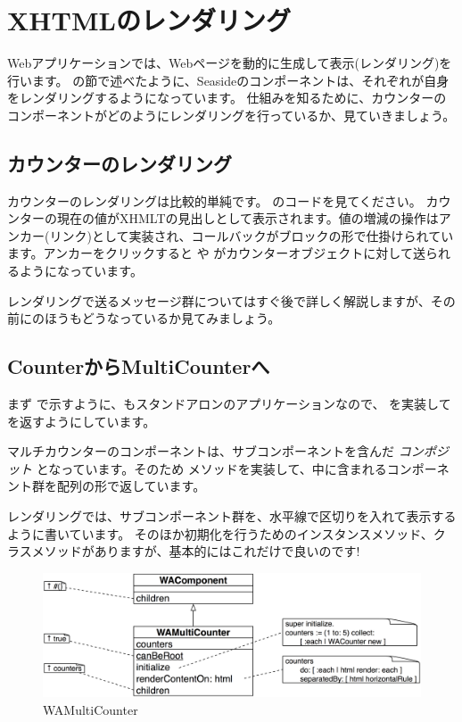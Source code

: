 \documentclass[a4paper,10pt,twoside]{book}
\begin{document}
\section{XHTMLのレンダリング}

Webアプリケーションでは、Webページを動的に生成して表示(レンダリング)を行います。 の節で述べたように、Seasideのコンポーネントは、それぞれが自身をレンダリングするようになっています。
仕組みを知るために、カウンターのコンポーネントがどのようにレンダリングを行っているか、見ていきましょう。

\subsection{カウンターのレンダリング}

カウンターのレンダリングは比較的単純です。 のコードを見てください。
カウンターの現在の値がXHMLTの見出しとして表示されます。値の増減の操作はアンカー(リンク)として実装され、コールバックがブロックの形で仕掛けられています。アンカーをクリックすると  や がカウンターオブジェクトに対して送られるようになっています。

レンダリングで送るメッセージ群についてはすぐ後で詳しく解説しますが、その前にのほうもどうなっているか見てみましょう。

\subsection{CounterからMultiCounterへ}

まず  で示すように、もスタンドアロンのアプリケーションなので、 を実装して を返すようにしています。

マルチカウンターのコンポーネントは、サブコンポーネントを含んだ \emph{コンポジット} となっています。そのため  メソッドを実装して、中に含まれるコンポーネント群を配列の形で返しています。

レンダリングでは、サブコンポーネント群を、水平線で区切りを入れて表示するように書いています。
そのほか初期化を行うためのインスタンスメソッド、クラスメソッドがありますが、基本的にはこれだけで良いのです!

\begin{figure}[bht]
\begin{center}
\includegraphics[width=\textwidth]{WAMultiCounter}
\caption{WAMultiCounter}
\end{center}
\end{figure}
\end{document}
